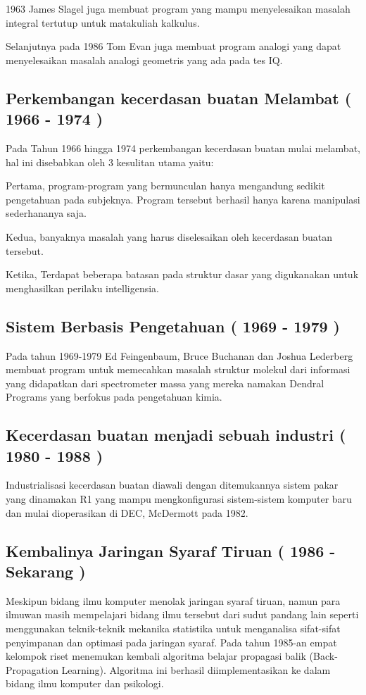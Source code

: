 \documentclass{homework}
\begin{document}
1963 James Slagel juga membuat program yang mampu menyelesaikan masalah integral tertutup untuk matakuliah kalkulus.

Selanjutnya pada 1986 Tom Evan juga membuat program analogi yang dapat menyelesaikan masalah analogi geometris yang ada pada tes IQ.

\subsection{Perkembangan kecerdasan buatan Melambat ( 1966 - 1974 )}
Pada Tahun 1966 hingga 1974 perkembangan kecerdasan buatan mulai melambat, hal ini disebabkan oleh 3 kesulitan utama yaitu:

Pertama, program-program yang bermunculan hanya mengandung sedikit pengetahuan pada subjeknya. Program tersebut berhasil hanya karena manipulasi sederhananya saja.

Kedua, banyaknya masalah yang harus diselesaikan oleh kecerdasan buatan tersebut.

Ketika, Terdapat beberapa batasan pada struktur dasar yang digukanakan untuk menghasilkan perilaku intelligensia.

\subsection{Sistem Berbasis Pengetahuan ( 1969 - 1979 )}
Pada tahun 1969-1979 Ed Feingenbaum, Bruce Buchanan dan Joshua Lederberg membuat program untuk memecahkan masalah struktur molekul dari informasi yang didapatkan dari spectrometer massa yang mereka namakan Dendral Programs yang berfokus pada pengetahuan kimia. 

\subsection{Kecerdasan buatan menjadi sebuah industri ( 1980 - 1988 )}
Industrialisasi kecerdasan buatan diawali dengan ditemukannya sistem pakar yang dinamakan R1 yang mampu mengkonfigurasi sistem-sistem komputer baru dan mulai dioperasikan di DEC, McDermott pada 1982.

\subsection{Kembalinya Jaringan Syaraf Tiruan ( 1986 - Sekarang )}
Meskipun bidang ilmu komputer menolak jaringan syaraf tiruan, namun para ilmuwan masih mempelajari bidang ilmu tersebut dari sudut pandang lain seperti menggunakan teknik-teknik mekanika statistika untuk menganalisa sifat-sifat penyimpanan dan optimasi pada jaringan syaraf.
Pada tahun 1985-an  empat kelompok riset menemukan kembali algoritma belajar propagasi balik (Back-Propagation Learning). Algoritma ini berhasil diimplementasikan ke dalam bidang ilmu komputer dan psikologi.
\end{document}
